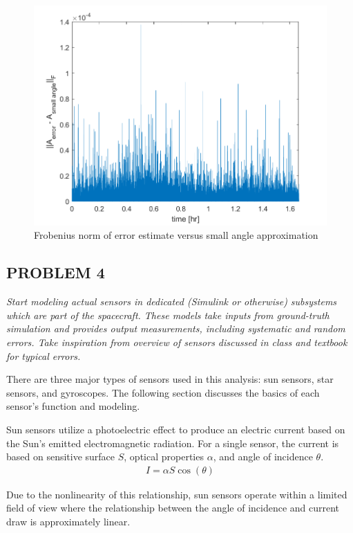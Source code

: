 \begin{figure}[H]
\centering
\includegraphics[scale=0.6]{Images/ps7_problem3.png}
\caption{Frobenius norm of error estimate versus small angle approximation}
\label{fig:ps7_problem3}
\end{figure}

\subsection{PROBLEM 4}
\textit{Start modeling actual sensors in dedicated (Simulink or otherwise) subsystems which are part of the spacecraft. These models take inputs from ground-truth simulation and provides output measurements, including systematic and random errors. Take inspiration from overview of sensors discussed in class and textbook for typical errors.}

There are three major types of sensors used in this analysis: sun sensors, star sensors, and gyroscopes. The following section discusses the basics of each sensor's function and modeling.

Sun sensors utilize a photoelectric effect to produce an electric current based on the Sun's emitted electromagnetic radiation. For a single sensor, the current is based on sensitive surface $S$, optical properties $\alpha$, and angle of incidence $\theta$.
\begin{align*}
    I = \alpha S \cos(\theta)
\end{align*}

Due to the nonlinearity of this relationship, sun sensors operate within a limited field of view where the relationship between the angle of incidence and current draw is approximately linear.

